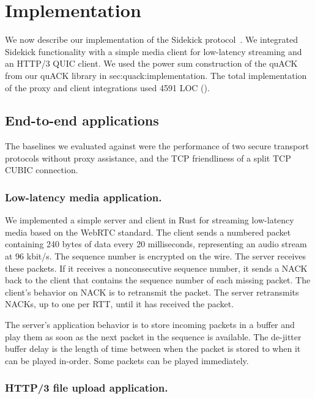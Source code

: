 \section{Implementation}
\label{sec:sidekick:implementation}



We now describe our implementation of the Sidekick protocol~\cite{sidekick-github}.
We integrated Sidekick functionality with a simple media client
for low-latency streaming and an HTTP/3 QUIC client. We used the power sum
construction of the quACK from our quACK library in \Cref
{sec:quack:implementation}. The total implementation of the proxy and client
integrations used 4591 LOC ().

\subsection{End-to-end applications}
\label{sec:sidekick:implementation:applications}

The baselines we evaluated against were the performance of two secure transport
protocols without proxy assistance, and the TCP friendliness of a split TCP
CUBIC connection.

\subsubsection{Low-latency media application.}
We implemented a simple server and client in Rust for streaming low-latency
media based on the WebRTC standard. The client sends a numbered packet containing 240 bytes of data every
20 milliseconds, representing an audio stream at 96 kbit/s.
The sequence number is encrypted on the wire.
The server receives these packets. If it receives a nonconsecutive sequence number,
it sends a NACK back to the client that contains the sequence number of each
missing packet. The client's behavior on NACK is to retransmit the packet. The
server retransmits NACKs, up to one per RTT, until it has received the packet.

The server's application behavior is to store incoming packets in a buffer
and play them as soon as the next packet in the sequence is available. The
de-jitter buffer delay is the length of time between when the packet is stored
to when it can be played in-order. Some packets can be played immediately.

\subsubsection{HTTP/3 file upload application.}

